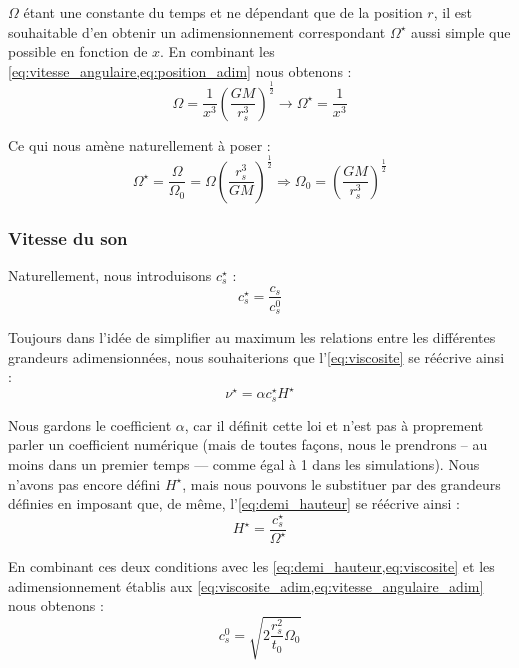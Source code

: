 $\Omega$ étant une constante du temps et ne dépendant que de la position $r$,
il est souhaitable d’en obtenir un adimensionnement correspondant
$\Omega^\star$ aussi simple que possible en fonction de $x$. En combinant les
\cref{eq:vitesse_angulaire,eq:position_adim} nous obtenons :
\begin{equation}
    \Omega = \frac{1}{x^3} \left( \frac{G M}{r_s^3} \right)^\frac{1}{2} \rightarrow \Omega^\star = \frac{1}{x^3}
\end{equation}

Ce qui nous amène naturellement à poser :
\begin{equation}
    \label{eq:vitesse_angulaire_adim}
    \Omega^{\star} = \frac{\Omega}{\Omega_0} = \Omega \left( \frac{r_s^3}{G M} \right)^\frac{1}{2} \Rightarrow \Omega_0 = \left( \frac{G M}{r_s^3} \right)^{\frac{1}{2}}
%
\end{equation}

\subsubsection{Vitesse du son}

Naturellement, nous introduisons $c_s^\star$ :
\begin{equation}
   c_s^\star = \frac{c_s}{c_s^0}
\end{equation}

Toujours dans l’idée de simplifier au maximum les relations entre les
différentes grandeurs adimensionnées, nous souhaiterions que
l’\cref{eq:viscosite} se réécrive ainsi :
\begin{equation}
    \nu^\star = \alpha c_s^\star H^\star
\end{equation}

Nous gardons le coefficient $\alpha$, car il définit cette loi et n’est pas à
proprement parler un coefficient numérique (mais de toutes façons, nous le
prendrons – au moins dans un premier temps — comme égal à 1 dans les
simulations). Nous n’avons pas encore défini $H^\star$, mais nous pouvons le
substituer par des grandeurs définies en imposant que, de même,
l’\cref{eq:demi_hauteur} se réécrive ainsi :
\begin{equation}
    \label{eq:rel_demi_hauteur_adim}
    H^\star = \frac{c_s^\star}{\Omega^\star}
\end{equation}

En combinant ces deux conditions avec les \cref{eq:demi_hauteur,eq:viscosite} et les adimensionnement
établis aux \cref{eq:viscosite_adim,eq:vitesse_angulaire_adim} nous obtenons :
\begin{equation}
    c_s^0 = \sqrt{2 \frac{r_s^2}{t_0} \Omega_0}
\end{equation}

